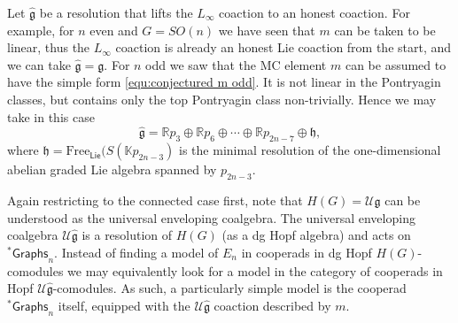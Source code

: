 \documentclass[a4paper]{amsart}
\theoremstyle{plain}
\theoremstyle{definition}
\newcommand{\alg}[1]{\mathfrak{{#1}}}
\newcommand{\R}{{\mathbb{R}}}
\newcommand{\K}{{\mathbb{K}}}
\newcommand{\Graphs}{{\mathsf{Graphs}}}
\newcommand{\FreeLie}{\mathrm{Free}_{\Lie}}
\newcommand{\Lie}{\mathsf{Lie}}
\newcommand{\mU}{\mathcal{U}}
\newcommand{\stG}{{}^*\Graphs}
\newcommand{\SO}{\mathit{SO}}
\begin{document}
Let $\hat{\alg g}$ be a resolution that lifts the $L_\infty$ coaction to an honest coaction.
For example, for $n$ even and $G=\SO(n)$ we have seen that $m$ can be taken to be linear, thus the $L_\infty$ coaction is already an honest Lie coaction from the start, and we can take $\hat{\alg g}=\alg g$.
For $n$ odd we saw that the MC element $m$ can be assumed to have the simple form \eqref{equ:conjectured m odd}. It is not linear in the Pontryagin classes, but contains only the top Pontryagin class non-trivially.
Hence we may take in this case
\begin{equation}\label{equ:hat g formula}
 \hat{\alg g} = \R p_3 \oplus \R p_6 \oplus \cdots \oplus \R p_{2n-7} \oplus \alg h,
\end{equation}
where $\alg h=\FreeLie(S(\K p_{2n-3})$ is the minimal resolution of the one-dimensional abelian graded Lie algebra spanned by $p_{2n-3}$.

Again restricting to the connected case first, note that $H(G)=\mU\alg g$ can be understood as the universal enveloping coalgebra.
The universal enveloping coalgebra $\mU\hat{\alg g}$ is a resolution of $H(G)$ (as a dg Hopf algebra) and acts on $\stG_n$.
Instead of finding a model of $E_n$ in cooperads in dg Hopf $H(G)$-comodules we may equivalently look for a model in the category of cooperads in Hopf $\mU\hat{\alg g}$-comodules.
As such, a particularly simple model is the cooperad $\stG_n$ itself, equipped with the $\mU\hat{\alg g}$ coaction described by $m$.
\end{document}
